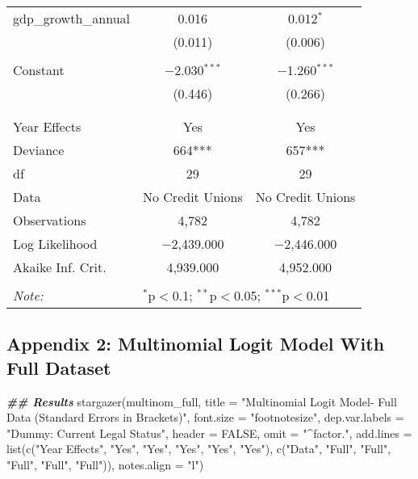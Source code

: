 \documentclass[a4paper,nobind]{templates/ociamthesis}
\newenvironment{Shaded}{\begin{snugshade}}{\end{snugshade}}
\newcommand{\AttributeTok}[1]{\textcolor[rgb]{0.77,0.63,0.00}{#1}}
\newcommand{\ConstantTok}[1]{\textcolor[rgb]{0.00,0.00,0.00}{#1}}
\newcommand{\DocumentationTok}[1]{\textcolor[rgb]{0.56,0.35,0.01}{\textbf{\textit{#1}}}}
\newcommand{\FunctionTok}[1]{\textcolor[rgb]{0.00,0.00,0.00}{#1}}
\newcommand{\NormalTok}[1]{#1}
\newcommand{\StringTok}[1]{\textcolor[rgb]{0.31,0.60,0.02}{#1}}
\renewenvironment{Shaded}
{
  \vspace{10pt}%
  \begin{snugshade}%
}{%
  \end{snugshade}%
  \vspace{8pt}%
}
\begin{document}
\begin{table}[!htbp]
\begin{tabular}{@{\extracolsep{5pt}}lcc}
 gdp\_growth\_annual & 0.016 & 0.012$^{*}$ \\ 
  & (0.011) & (0.006) \\ 
  & & \\ 
 Constant & $-$2.030$^{***}$ & $-$1.260$^{***}$ \\ 
  & (0.446) & (0.266) \\ 
  & & \\ 
\hline \\[-1.8ex] 
Year Effects & Yes & Yes \\ 
Deviance & 664*** & 657*** \\ 
df & 29 & 29 \\ 
Data & No Credit Unions & No Credit Unions \\ 
Observations & 4,782 & 4,782 \\ 
Log Likelihood & $-$2,439.000 & $-$2,446.000 \\ 
Akaike Inf. Crit. & 4,939.000 & 4,952.000 \\ 
\hline 
\hline \\[-1.8ex] 
\textit{Note:}  & \multicolumn{2}{l}{$^{*}$p$<$0.1; $^{**}$p$<$0.05; $^{***}$p$<$0.01} \\ 
\end{tabular} 
\end{table}

\newpage

\hypertarget{appendix-2-multinomial-logit-model-with-full-dataset}{%
\subsection{Appendix 2: Multinomial Logit Model With Full Dataset}\label{appendix-2-multinomial-logit-model-with-full-dataset}}

\begin{Shaded}
\begin{Highlighting}[]
\DocumentationTok{\#\# Results }
\FunctionTok{stargazer}\NormalTok{(multinom\_full, }\AttributeTok{title =} \StringTok{"Multinomial Logit Model{-} Full Data (Standard Errors in Brackets)"}\NormalTok{, }\AttributeTok{font.size =} \StringTok{"footnotesize"}\NormalTok{, }\AttributeTok{dep.var.labels =} \StringTok{"Dummy: Current Legal Status"}\NormalTok{, }\AttributeTok{header =} \ConstantTok{FALSE}\NormalTok{, }\AttributeTok{omit =} \StringTok{"\^{}factor."}\NormalTok{, }\AttributeTok{add.lines =} \FunctionTok{list}\NormalTok{(}\FunctionTok{c}\NormalTok{(}\StringTok{"Year Effects"}\NormalTok{, }\StringTok{"Yes"}\NormalTok{, }\StringTok{"Yes"}\NormalTok{, }\StringTok{"Yes"}\NormalTok{, }\StringTok{"Yes"}\NormalTok{, }\StringTok{"Yes"}\NormalTok{), }\FunctionTok{c}\NormalTok{(}\StringTok{"Data"}\NormalTok{, }\StringTok{"Full"}\NormalTok{, }\StringTok{"Full"}\NormalTok{, }\StringTok{"Full"}\NormalTok{, }\StringTok{"Full"}\NormalTok{, }\StringTok{"Full"}\NormalTok{)), }\AttributeTok{notes.align =} \StringTok{"l"}\NormalTok{)}
\end{Highlighting}
\end{Shaded}
\end{document}
